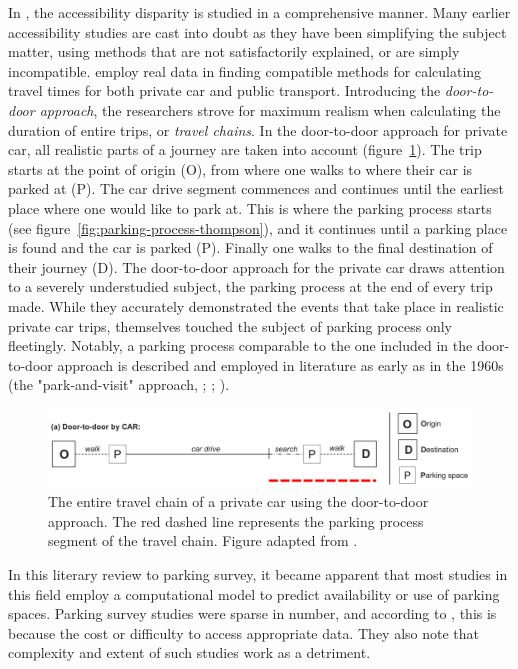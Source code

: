 In , the accessibility disparity is studied in a comprehensive manner. Many earlier accessibility studies are cast into doubt as they have been simplifying the subject matter, using methods that are not satisfactorily explained, or are simply incompatible. \citeauthor{Salonen2013} employ real data in finding compatible methods for calculating travel times for both private car and public transport. Introducing the \textit{door-to-door approach}, the researchers strove for maximum realism when calculating the duration of entire trips, or \textit{travel chains}. In the door-to-door approach for private car, all realistic parts of a journey are taken into account (figure~\ref{fig:door-to-door}). The trip starts at the point of origin (O), from where one walks to where their car is parked at (P). The car drive segment commences and continues until the earliest place where one would like to park at. This is where the parking process starts (see figure~\ref{fig:parking-process-thompson}), and it continues until a parking place is found and the car is parked (P). Finally one walks to the final destination of their journey (D). The door-to-door approach for the private car draws attention to a severely understudied subject, the parking process at the end of every trip made. While they accurately demonstrated the events that take place in realistic private car trips, \citeauthor{Salonen2013} themselves touched the subject of parking process only fleetingly. Notably, a parking process comparable to the one included in the door-to-door approach is described and employed in literature as early as in the 1960s (the "park-and-visit" approach, \cite{Inwood1966}; \cite{May1985}; \cite{Belloche2015}). 

\begin{figure}[H]%
    \includegraphics[width=\textwidth]{images/door2door.png}
    \caption[Door-to-door approach]{The entire travel chain of a private car using the door-to-door approach. The red dashed line represents the parking process segment of the travel chain. Figure adapted from .}%
    \label{fig:door-to-door}%
\end{figure}

In this literary review to parking survey, it became apparent that most studies in this field employ a computational model to predict availability or use of parking spaces. Parking survey studies were sparse in number, and according to , this is because the cost or difficulty to access appropriate data. They also note that complexity and extent of such studies work as a detriment.

